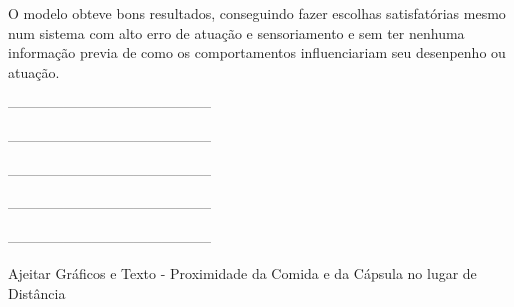 O modelo obteve bons resultados, conseguindo fazer escolhas satisfatórias mesmo num sistema com alto erro de atuação e sensoriamento e sem ter nenhuma informação previa de como os comportamentos influenciariam seu desenpenho ou atuação.






--------------------------------------------

--------------------------------------------

--------------------------------------------

--------------------------------------------

--------------------------------------------



Ajeitar Gráficos e Texto - Proximidade da Comida e da Cápsula no lugar de Distância